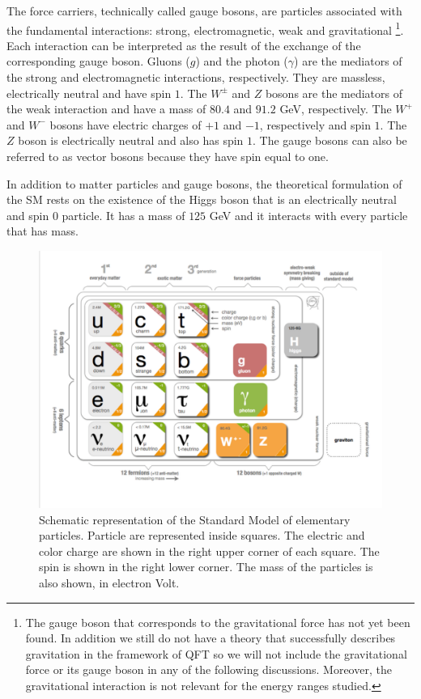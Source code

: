 The force carriers, technically called gauge bosons, are particles associated with the fundamental interactions: strong, electromagnetic, weak and gravitational \footnote{The gauge boson that corresponds to the gravitational force has not yet been found. In addition we still do not have a theory that successfully describes gravitation in the framework of QFT so we will not include the gravitational force or its gauge boson in any of the following discussions. Moreover, the gravitational interaction is not relevant for the energy ranges studied.}. Each interaction can be interpreted as the result of the exchange of the corresponding gauge boson. Gluons ($g$) and the photon ($\gamma$) are the mediators of the strong and electromagnetic interactions, respectively. They are massless, electrically neutral and have spin $1$. The $W^{\pm}$ and $Z$ bosons are the mediators of the weak interaction and have a mass of $80.4$ and $91.2$ GeV, respectively. The $W^+$ and $W^-$ bosons have electric charges of $+1$ and $-1$, respectively and spin $1$. The $Z$ boson is electrically neutral and also has spin $1$. The gauge bosons can also be referred to as vector bosons because they have spin equal to one.

In addition to matter particles and gauge bosons, the theoretical formulation of the SM rests on the existence of the Higgs boson that is an electrically neutral and spin $0$ particle. It has a mass of $125$ GeV and it interacts with every particle that has mass.


\begin{figure}[]
	\centering
	\includegraphics[trim={.5cm 1.5cm 0.5cm 0},clip,width=.8\textwidth]{./Figures/SM_CERN1.png}
	\caption{Schematic representation of the Standard Model of elementary particles. Particle are represented inside squares. The electric and color charge are shown in the right upper corner of each square. The spin is shown in the right lower corner. The mass of the particles is also shown, in electron Volt.}
	\label{fig:sm_particles}
\end{figure}

